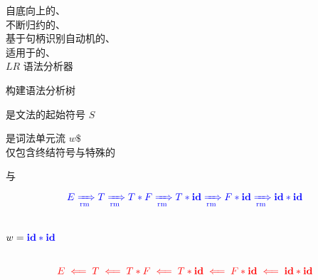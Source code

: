 
\begin{frame}{}
  \begin{center}
    自底向上的、\\[15pt]
    不断归约的、\\[15pt]
    基于句柄识别自动机的、\\[15pt]
    适用于的、\\[15pt]
    $LR$ 语法分析器
  \end{center}
\end{frame}

\begin{frame}{}
  \begin{center}
    {\large {}构建语法分析树}

    \vspace{0.60cm}
    是文法的起始符号 $S$

    \vspace{1.00cm}

    \vspace{1.00cm}
    是词法单元流 $w\$$ \\[8pt]
    仅包含终结符号与特殊的
  \end{center}
\end{frame}

\begin{frame}{}
  \begin{center}
     与 

    \vspace{-0.30cm}
    \[
      \textcolor{blue}{E \xRightarrow[\text{rm}]{} T \xRightarrow[\text{rm}]{} T \ast F \xRightarrow[\text{rm}]{} T \ast \text{\bf id} \xRightarrow[\text{rm}]{} F \ast \text{\bf id} \xRightarrow[\text{rm}]{} \text{\bf id} \ast \text{\bf id}}
    \]

    \vspace{-0.50cm}
    \begin{columns}
        

        \vspace{-0.80cm}
        \[
          w = \textcolor{blue}{\text{\bf id} \ast \text{\bf id}}
        \]
    \end{columns}

    \[
      \textcolor{red}{E \impliedby T \impliedby T \ast F \impliedby T \ast \text{\bf id} \impliedby F \ast \text{\bf id}
        \impliedby \text{\bf id} \ast \text{\bf id}}
    \]
  \end{center}
\end{frame}

